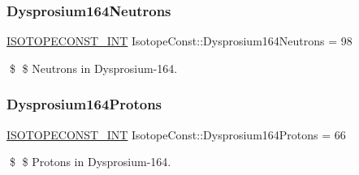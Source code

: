 \subsubsection{\texorpdfstring{Dysprosium164\+Neutrons}{Dysprosium164Neutrons}}
{\footnotesize\ttfamily \mbox{\hyperlink{group___isotope_const-_macros_ga5f18360b3e99483a35c32d789e62621c}{I\+S\+O\+T\+O\+P\+E\+C\+O\+N\+S\+T\+\_\+\+I\+NT}} Isotope\+Const\+::\+Dysprosium164\+Neutrons = 98}

\$ \$ Neutrons in Dysprosium-\/164. \mbox{\label{group___isotope_const-_dysprosium-_dy164_gabc88720a62740c7e2b446c3c9c28c34d}} 
\subsubsection{\texorpdfstring{Dysprosium164\+Protons}{Dysprosium164Protons}}
{\footnotesize\ttfamily \mbox{\hyperlink{group___isotope_const-_macros_ga5f18360b3e99483a35c32d789e62621c}{I\+S\+O\+T\+O\+P\+E\+C\+O\+N\+S\+T\+\_\+\+I\+NT}} Isotope\+Const\+::\+Dysprosium164\+Protons = 66}

\$ \$ Protons in Dysprosium-\/164. 